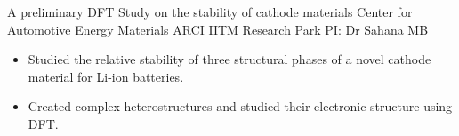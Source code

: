 

        {A preliminary DFT Study on the stability of cathode materials}
        {\newline Center for Automotive Energy Materials}
        {ARCI IITM Research Park}
        {PI: Dr Sahana MB}{
    \begin{itemize}
		\item Studied the relative stability of three structural phases of a novel cathode material for Li-ion batteries.
		\item Created complex heterostructures and studied
		their electronic structure using DFT.
    \end{itemize}
	}

